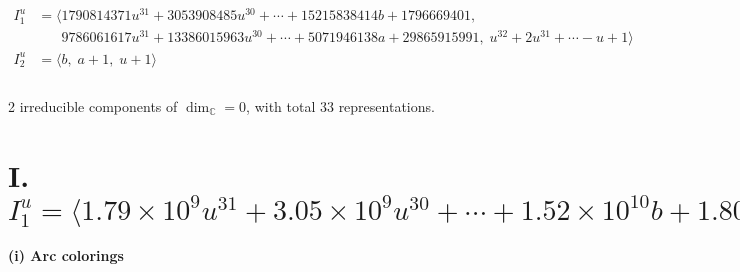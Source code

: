 \documentclass[1p]{elsarticle_modified}
\theoremstyle{definition}
\begin{document}
\begin{align*}
I^u_{1}&=\langle 
1790814371 u^{31}+3053908485 u^{30}+\cdots+15215838414 b+1796669401,\\
\phantom{I^u_{1}}&\phantom{= \langle  }9786061617 u^{31}+13386015963 u^{30}+\cdots+5071946138 a+29865915991,\;u^{32}+2 u^{31}+\cdots- u+1\rangle \\
I^u_{2}&=\langle 
b,\;a+1,\;u+1\rangle \\
\\
\end{align*}
\raggedright * 2 irreducible components of $\dim_{\mathbb{C}}=0$, with total 33 representations.\\
\newpage
\renewcommand{\arraystretch}{1}
\centering \section*{I. $I^u_{1}= \langle 1.79\times10^{9} u^{31}+3.05\times10^{9} u^{30}+\cdots+1.52\times10^{10} b+1.80\times10^{9},\;9.79\times10^{9} u^{31}+1.34\times10^{10} u^{30}+\cdots+5.07\times10^{9} a+2.99\times10^{10},\;u^{32}+2 u^{31}+\cdots- u+1 \rangle$}
\flushleft \textbf{(i) Arc colorings}\\
\end{document}
